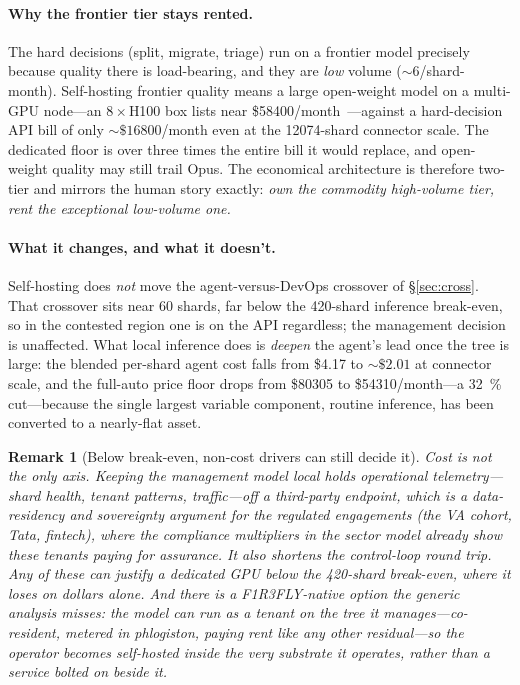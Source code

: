 \documentclass[11pt]{article}
\newtheorem{remark}{Remark}
\begin{document}
\paragraph{Why the frontier tier stays rented.} The hard decisions (split, migrate, triage) run on a
frontier model precisely because quality there is load-bearing, and they are \emph{low} volume
($\sim\!6$/shard-month). Self-hosting frontier quality means a large open-weight model on a
multi-GPU node---an $8\times$H100 box lists near \$\num{58400}/month~\cite{oci2026}---against a
hard-decision API bill of only $\sim\$\num{16800}$/month even at the \num{12074}-shard connector
scale. The dedicated floor is over three times the entire bill it would replace, and open-weight
quality may still trail Opus. The economical architecture is therefore two-tier and mirrors the
human story exactly: \emph{own the commodity high-volume tier, rent the exceptional low-volume one.}

\paragraph{What it changes, and what it doesn't.} Self-hosting does \emph{not} move the agent-versus-DevOps
crossover of \S\ref{sec:cross}. That crossover sits near \num{60} shards, far below the \num{420}-shard
inference break-even, so in the contested region one is on the API regardless; the management decision
is unaffected. What local inference does is \emph{deepen} the agent's lead once the tree is large: the
blended per-shard agent cost falls from \$4.17 to $\sim\$2.01$ at connector scale, and the full-auto
price floor drops from \$\num{80305} to \$\num{54310}/month---a \SI{32}{\percent} cut---because the
single largest variable component, routine inference, has been converted to a nearly-flat asset.

\begin{remark}[Below break-even, non-cost drivers can still decide it]
Cost is not the only axis. Keeping the management model local holds operational telemetry---shard
health, tenant patterns, traffic---off a third-party endpoint, which is a data-residency and
sovereignty argument for the regulated engagements (the VA cohort, Tata, fintech), where the
compliance multipliers in the sector model already show these tenants paying for assurance. It also
shortens the control-loop round trip. Any of these can justify a dedicated GPU \emph{below} the
\num{420}-shard break-even, where it loses on dollars alone. And there is a F1R3FLY-native option the
generic analysis misses: the model can run \emph{as a tenant on the tree it manages}---co-resident,
metered in phlogiston, paying rent like any other residual---so the operator becomes self-hosted
inside the very substrate it operates, rather than a service bolted on beside it.
\end{remark}
\end{document}
